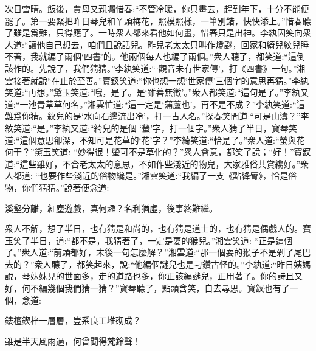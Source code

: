 \begin{parag}
    次日雪晴。飯後，賈母又親囑惜春:“不管冷暖，你只畫去，趕到年下，十分不能便罷了。第一要緊把昨日琴兒和丫頭梅花，照模照樣，一筆別錯，快快添上。”惜春聽了雖是爲難，只得應了。一時衆人都來看他如何畫，惜春只是出神。李紈因笑向衆人道:“讓他自己想去，咱們且說話兒。昨兒老太太只叫作燈謎，回家和綺兒紋兒睡不著，我就編了兩個‘四書’的。他兩個每人也編了兩個。”衆人聽了，都笑道:“這倒該作的。先說了，我們猜猜。”李紈笑道:“‘觀音未有世家傳’，打《四書》一句。”湘雲接著就說“在止於至善。”寶釵笑道:“你也想一想‘世家傳’三個字的意思再猜。”李紈笑道:“再想。”黛玉笑道:“哦，是了。是‘雖善無徵’。”衆人都笑道:“這句是了。”李紈又道:“一池青草草何名。”湘雲忙道:“這一定是‘蒲蘆也’。再不是不成？”李紈笑道:“這難爲你猜。紋兒的是‘水向石邊流出冷’，打一古人名。”探春笑問道:“可是山濤？”李紋笑道:“是。”李紈又道:“綺兒的是個 ‘螢’字，打一個字。”衆人猜了半日，寶琴笑道:“這個意思卻深，不知可是花草的‘花’字？”李綺笑道:“恰是了。”衆人道:“螢與花何干？”黛玉笑道: “妙得很！螢可不是草化的？”衆人會意，都笑了說；“好！”寶釵道:“這些雖好，不合老太太的意思，不如作些淺近的物兒，大家雅俗共賞纔好。”衆人都道: “也要作些淺近的俗物纔是。”湘雲笑道:“我編了一支《點絳脣》，恰是俗物，你們猜猜。”說著便念道:
\end{parag}


\begin{poem}
    \begin{pl}溪壑分離，紅塵遊戲，真何趣？名利猶虛，後事終難繼。\end{pl}
\end{poem}


\begin{parag}
    衆人不解，想了半日，也有猜是和尚的，也有猜是道士的，也有猜是偶戲人的。寶玉笑了半日，道:“都不是，我猜著了，一定是耍的猴兒。”湘雲笑道: “正是這個了。”衆人道:“前頭都好，末後一句怎麼解？”湘雲道:“那一個耍的猴子不是剁了尾巴去的？”衆人聽了，都笑起來，說:“他編個謎兒也是刁鑽古怪的。”李紈道:“昨日姨媽說，琴妹妹見的世面多，走的道路也多，你正該編謎兒，正用著了。你的詩且又好，何不編幾個我們猜一猜？”寶琴聽了，點頭含笑，自去尋思。寶釵也有了一個，念道:
\end{parag}


\begin{poem}
    \begin{pl}鏤檀鍥梓一層層，豈系良工堆砌成？\end{pl}

    \begin{pl}雖是半天風雨過，何曾聞得梵鈴聲！\end{pl}

\end{poem}


